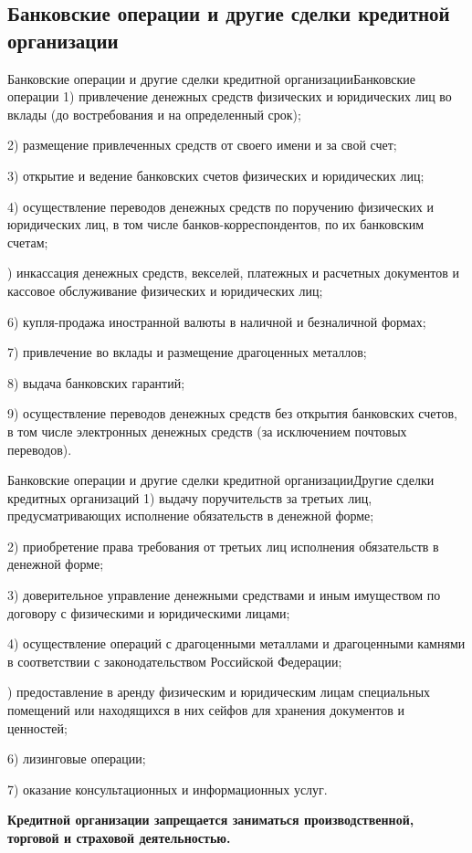 \documentclass[_Banking_p1.tex]{subfiles}
\begin{document}
\subsection{Банковские операции и другие сделки кредитной организации}
\begin{frame}[allowframebreaks]{Банковские операции и другие сделки кредитной организации}{Банковские операции}
1) привлечение денежных средств физических и юридических лиц во вклады (до востребования и на определенный срок);

2) размещение привлеченных средств от своего имени и за свой счет;

3) открытие и ведение банковских счетов физических и юридических лиц;

4) осуществление переводов денежных средств по поручению физических и юридических лиц, в том числе банков-корреспондентов, по их банковским счетам;

) инкассация денежных средств, векселей, платежных и расчетных документов и кассовое обслуживание физических и юридических лиц;

6) купля-продажа иностранной валюты в наличной и безналичной формах;

7) привлечение во вклады и размещение драгоценных металлов;

8) выдача банковских гарантий;

9) осуществление переводов денежных средств без открытия банковских счетов, в том числе электронных денежных средств (за исключением почтовых переводов).
\end{frame}

\begin{frame}[allowframebreaks]{Банковские операции и другие сделки кредитной организации}{Другие сделки кредитных организаций}
1) выдачу поручительств за третьих лиц, предусматривающих исполнение обязательств в денежной форме;

2) приобретение права требования от третьих лиц исполнения обязательств в денежной форме;

3) доверительное управление денежными средствами и иным имуществом по договору с физическими и юридическими лицами;

4) осуществление операций с драгоценными металлами и драгоценными камнями в соответствии с законодательством Российской Федерации;

) предоставление в аренду физическим и юридическим лицам специальных помещений или находящихся в них сейфов для хранения документов и ценностей;

6) лизинговые операции;

7) оказание консультационных и информационных услуг.



\textbf{Кредитной организации запрещается заниматься производственной, торговой и страховой деятельностью.}

\end{frame}
\end{document}
